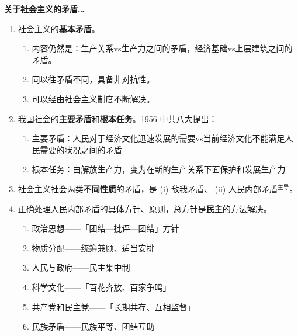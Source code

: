 \documentclass[UTF8]{ctexart}
\newcommand\Emph[2]{\colorbox{c#1-light}{\textcolor{c#1-emph}{\textbf{#2}}}}
\begin{document}
\begin{mybox}{4}
\textbf{关于社会主义的矛盾…}
\begin{enumerate}
  \item 社会主义的\Emph{4}{基本矛盾}。
  \begin{enumerate}[label={\roman{enumii})}, start=1]
    \item 内容仍然是：生产关系vs生产力之间的矛盾，经济基础vs上层建筑之间的矛盾。
    \item 同以往矛盾不同，具备非对抗性。
    \item 可以经由社会主义制度不断解决。
  \end{enumerate}
  \item 我国社会的\Emph{4}{主要矛盾}和\Emph{4}{根本任务}。1956 中共八大提出：
  \begin{enumerate}[label={\roman{enumii})}, start=1]
    \item 主要矛盾：人民对于经济文化迅速发展的需要vs当前经济文化不能满足人民需要的状况之间的矛盾
    \item 根本任务：由解放生产力，变为在新的生产关系下面保护和发展生产力
  \end{enumerate}
  \item 社会主义社会两类\Emph{4}{不同性质}的矛盾，是 (i) 敌我矛盾、 (ii) 人民内部矛盾$^{\text{主导}}$。
  \item 正确处理人民内部矛盾的具体方针、原则，总方针是\Emph{4}{民主}的方法解决。
  \begin{enumerate}[label={\roman{enumii})}, start=1]
    \item 政治思想——「团结—批评—团结」方针
    \item 物质分配——统筹兼顾、适当安排
    \item 人民与政府——民主集中制
    \item 科学文化——「百花齐放、百家争鸣」
    \item 共产党和民主党——「长期共存、互相监督」
    \item 民族矛盾——民族平等、团结互助
  \end{enumerate}
\end{enumerate}
\end{mybox}
\end{document}
